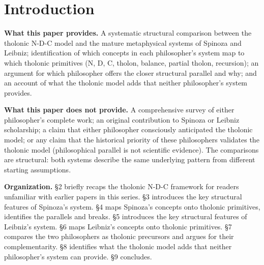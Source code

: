 \documentclass[12pt]{article}
\begin{document}
\begin{abstract}
The paper argues that Spinoza most accurately captured the dynamic
process dimension of the tholonic model, specifically the recursive
productive relation between N and its D-C differentiates, while Leibniz
most accurately captured the structural unit dimension, specifically the
self-similar hierarchically nested tholon. The tholonic model provides a
formal mathematical unification that neither philosopher achieved: a
recursive triadic structure grounded in the first primes that
encompasses both the process insights of Spinoza and the unit insights
of Leibniz. Both philosophers also identified the key failure mode
predicted by the tholonic model, in which a system loses its stable
N-state when D and C fall into severe imbalance, though neither had the
formal vocabulary to name it as such.
\end{abstract}

\section{Introduction}\label{introduction}

\textbf{What this paper provides.} A systematic structural comparison
between the tholonic N-D-C model and the mature metaphysical systems of
Spinoza and Leibniz; identification of which concepts in each
philosopher's system map to which tholonic primitives (N, D, C, tholon,
balance, partial tholon, recursion); an argument for which philosopher
offers the closer structural parallel and why; and an account of what
the tholonic model adds that neither philosopher's system provides.

\textbf{What this paper does not provide.} A comprehensive survey of
either philosopher's complete work; an original contribution to Spinoza
or Leibniz scholarship; a claim that either philosopher consciously
anticipated the tholonic model; or any claim that the historical
priority of these philosophers validates the tholonic model
(philosophical parallel is not scientific evidence). The comparisons are
structural: both systems describe the same underlying pattern from
different starting assumptions.

\textbf{Organization.} §2 briefly recaps the tholonic N-D-C framework
for readers unfamiliar with earlier papers in this series. §3 introduces
the key structural features of Spinoza's system. §4 maps Spinoza's
concepts onto tholonic primitives, identifies the parallels and breaks.
§5 introduces the key structural features of Leibniz's system. §6 maps
Leibniz's concepts onto tholonic primitives. §7 compares the two
philosophers as tholonic precursors and argues for their
complementarity. §8 identifies what the tholonic model adds that neither
philosopher's system can provide. §9 concludes.
\end{document}
